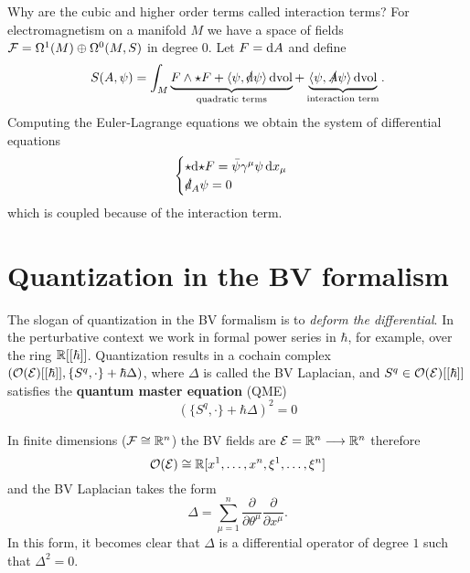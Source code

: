 \begin{example}
  Why are the cubic and higher order terms called interaction terms? For electromagnetism on a manifold $M$ we have a space of fields
  $\mathcal{F} = \Omega^1(M) \oplus \Omega^0(M, S)$ in degree $0$. Let $F = \mathrm{d} A$ and define
  \begin{equation*}
    S(A, \psi) = \int_M
    \underbrace{F \wedge {\star} F
    + \langle \psi, \slashed{\mathrm{d}} \psi \rangle \, \mathrm{d} \mathrm{vol}}_{\text{quadratic terms}}
    + \underbrace{\langle \psi, \slashed{A} \psi \rangle \, \mathrm{d} \mathrm{vol}}_{\text{interaction term}}.
  \end{equation*}
  Computing the Euler-Lagrange equations we obtain the system of differential equations
  \begin{equation*}
    \begin{cases}
      {\star} \mathrm{d} {\star} F = \bar{\psi} \gamma^\mu \psi \, \mathrm{d} x_\mu \\
      \slashed{d}_A \psi = 0
    \end{cases}
  \end{equation*}
  which is coupled because of the interaction term.
\end{example}

\section{Quantization in the BV formalism}

The slogan of quantization in the BV formalism is to \emph{deform the differential}. In the perturbative context we work in formal power series in $\hbar$, for example, over the ring $\mathbb{R}[[\hbar]]$. Quantization results in a cochain complex
$(\mathcal{O}(\mathcal{E})[[\hbar]], \{S^q, \cdot\} + \hbar \Delta)$, where $\Delta$ is called the BV Laplacian, and 
$S^q \in \mathcal{O}(\mathcal{E})[[\hbar]]$ satisfies the \textbf{quantum master equation} (QME)
\begin{equation}
  \label{eq:qme}
  (\{S^q, \cdot \} + \hbar \Delta)^2 = 0
\end{equation}

\begin{example}
  In finite dimensions ($\mathcal{F} \cong \mathbb{R}^n$) the BV fields are
  $\mathcal{E} = \mathbb{R}^n \longrightarrow \mathbb{R}^n$
  therefore
  \begin{equation*}
    \mathcal{O}(\mathcal{E}) \cong \mathbb{R} [x^1, \dots, x^n, \xi^1, \dots, \xi^n]
  \end{equation*}
  and the BV Laplacian takes the form
  \begin{equation*}
    \Delta = \sum_{\mu = 1}^n \frac{\partial}{\partial \theta^\mu} \frac{\partial}{\partial x^\mu}.
  \end{equation*}
  In this form, it becomes clear that $\Delta$ is a differential operator of degree $1$ such that $\Delta^2 = 0$.
\end{example}

